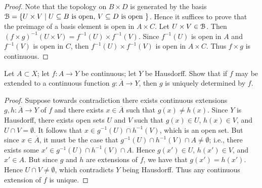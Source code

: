 \documentclass[12pt,twoside,openany]{memoir}
\begin{document}
    {\color{blue} \begin{proof}
        Note that the topology on $B \times D$ is generated by the basis $\mathcal{B} = \{U \times V \mid U \subseteq B \text{ is open, }V \subseteq D \text{ is open }\}$. Hence it suffices to prove that the preimage of a basis element is open in $A \times C$. Let $U \times V \in \mathcal{B}$. Then $(f \times g)^{-1}(U \times V) = f^{-1}(U) \times f^{-1}(V)$. Since $f^{-1}(U)$ is open in $A$ and $f^{-1}(V)$ is open in $C$, then $f^{-1}(U) \times f^{-1}(V)$ is open in $A \times C$. Thus $f \times g$ is continuous.
    \end{proof}}
\begin{exercise}[manual-num={13}]
Let $A \subset X$; let $f:A \rightarrow Y$ be continuous; let $Y$ be Hausdorff. Show that if $f$ may be extended to a continuous function $g:\overline{A} \rightarrow Y$, then $g$ is uniquely determined by $f$.
\end{exercise}
    {\color{blue} \begin{proof}
        Suppose towards contradiction there exists continuous extensions $g,h:\overline{A} \rightarrow Y$ of $f$ and there exists $x \in \overline{A}$ such that $g(x) \neq h(x)$. Since $Y$ is Hausdorff, there exists open sets $U$ and $V$ such that $g(x) \in U$, $h(x) \in V$, and $U \cap V = \emptyset$. It follows that $x \in g^{-1}(U) \cap h^{-1}(V)$, which is an open set. But since $x \in \overline{A}$, it must be the case that $g^{-1}(U) \cap h^{-1}(V) \cap A \neq \emptyset$; i.e., there exists some $x' \in g^{-1}(U) \cap h^{-1}(V) \cap A$. Hence $g(x') \in U$, $h(x') \in V$, and $x' \in A$. But since $g$ and $h$ are extensions of $f$, we have that $g(x') = h(x')$. Hence $U \cap V \neq \emptyset$, which contradicts $Y$ being Hausdorff. Thus any continuous extension of $f$ is unique.
    \end{proof}}
\end{document}
